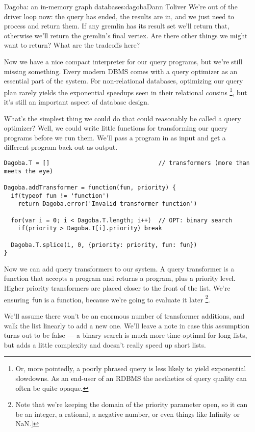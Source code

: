 \begin{aosachapter}{Dagoba: an in-memory graph database}{s:dagoba}{Dann Toliver}
We're out of the driver loop now: the query has ended, the results are
in, and we just need to process and return them. If any gremlin has its
result set we'll return that, otherwise we'll return the gremlin's final
vertex. Are there other things we might want to return? What are the
tradeoffs here?

\label{query-transformers}

Now we have a nice compact interpreter for our query programs, but we're
still missing something. Every modern DBMS comes with a query optimizer
as an essential part of the system. For non-relational databases,
optimizing our query plan rarely yields the exponential speedups seen in
their relational cousins \footnote{Or, more pointedly, a poorly phrased
  query is less likely to yield exponential slowdowns. As an end-user of
  an RDBMS the aesthetics of query quality can often be quite opaque.},
but it's still an important aspect of database design.

What's the simplest thing we could do that could reasonably be called a
query optimizer? Well, we could write little functions for transforming
our query programs before we run them. We'll pass a program in as input
and get a different program back out as output.

\begin{verbatim}
Dagoba.T = []                               // transformers (more than meets the eye)

Dagoba.addTransformer = function(fun, priority) {
  if(typeof fun != 'function')
    return Dagoba.error('Invalid transformer function')

  for(var i = 0; i < Dagoba.T.length; i++)  // OPT: binary search
    if(priority > Dagoba.T[i].priority) break

  Dagoba.T.splice(i, 0, {priority: priority, fun: fun})
}
\end{verbatim}

Now we can add query transformers to our system. A query transformer is
a function that accepts a program and returns a program, plus a priority
level. Higher priority transformers are placed closer to the front of
the list. We're ensuring \texttt{fun} is a function, because we're going
to evaluate it later \footnote{Note that we're keeping the domain of the
  priority parameter open, so it can be an integer, a rational, a
  negative number, or even things like Infinity or NaN.{]}}.

We'll assume there won't be an enormous number of transformer additions,
and walk the list linearly to add a new one. We'll leave a note in case
this assumption turns out to be false --- a binary search is much more
time-optimal for long lists, but adds a little complexity and doesn't
really speed up short lists.


\end{aosachapter}
